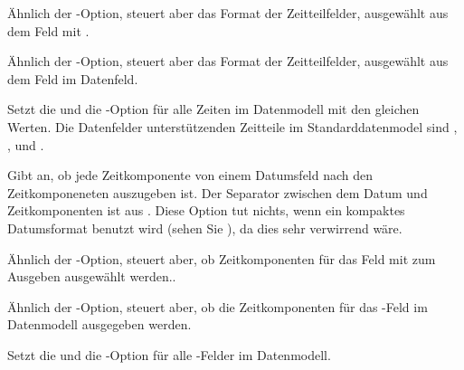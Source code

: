 \documentclass{ltxdockit}[2011/03/25]
\begin{document}
\begin{optionlist}
Ähnlich der -Option,  steuert aber das Format der Zeitteilfelder, ausgewählt
aus dem Feld mit .


Ähnlich der -Option, steuert aber das Format der Zeitteilfelder, ausgewählt
aus dem Feld  im Datenfeld.


Setzt die  und die -Option für alle Zeiten im Datenmodell mit den gleichen Werten. Die Datenfelder unterstützenden Zeitteile
im Standarddatenmodel sind , ,  und .


Gibt an, ob jede Zeitkomponente von einem Datumsfeld nach den Zeitkomponeneten
auszugeben ist. Der Separator zwischen dem Datum und Zeitkomponenten ist  aus . Diese Option tut nichts, wenn ein
kompaktes Datumsformat benutzt wird (sehen Sie ), da dies sehr verwirrend wäre. 


Ähnlich der -Option, steuert aber, ob Zeitkomponenten für das Feld
mit  zum Ausgeben ausgewählt werden..


Ähnlich der -Option, steuert aber, ob die Zeitkomponenten für das
-Feld im Datenmodell ausgegeben werden.


Setzt die  und die -Option 
für alle -Felder im Datenmodell.




\end{optionlist}
\end{document}
